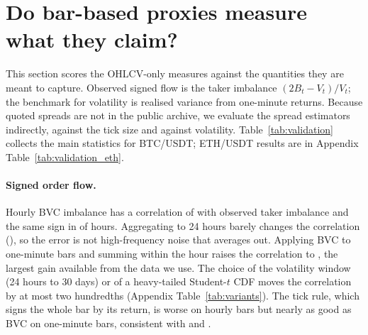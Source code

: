 \section{Do bar-based proxies measure what they claim?}\label{sec:validation}

This section scores the OHLCV-only measures against the quantities they are meant to capture.
Observed signed flow is the taker imbalance $(2B_t-V_t)/V_t$; the benchmark for volatility is
realised variance from one-minute returns. Because quoted spreads are not in the public archive, we
evaluate the spread estimators indirectly, against the tick size and against volatility.
Table~\ref{tab:validation} collects the main statistics for BTC/USDT; ETH/USDT results are in
Appendix Table~\ref{tab:validation_eth}.

\begin{table}[t]
\centering\caption{Bar-based proxies against observed quantities, BTC/USDT}\label{tab:validation}
\resizebox{\textwidth}{!}{}
\end{table}

\paragraph{Signed order flow.} Hourly BVC imbalance has a correlation of \BTCbvcCorr{} with observed
taker imbalance and the same sign in \BTCbvcSign{} of hours. Aggregating to 24 hours barely changes
the correlation (\BTCbvcCorrDay), so the error is not high-frequency noise that averages out. Applying
BVC to one-minute bars and summing within the hour raises the correlation to \BTCbvcOneMinCorr{}, the
largest gain available from the data we use. The choice of the volatility window (24 hours to
30 days) or of a heavy-tailed Student-$t$ CDF moves the correlation by at most two hundredths
(Appendix Table~\ref{tab:variants}). The tick rule, which signs the whole bar by its return, is
worse on hourly bars but nearly as good as BVC on one-minute bars, consistent with
\citet{chakrabarty2015} and \citet{panayides2019}.

